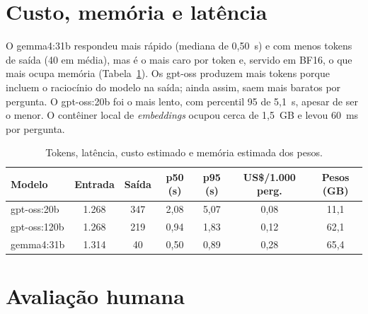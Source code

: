 \section{Custo, memória e latência}

O gemma4:31b respondeu mais rápido (mediana de 0,50~s) e com menos tokens de saída (40 em
média), mas é o mais caro por token e, servido em BF16, o que mais ocupa memória
(Tabela~\ref{tab:custo}). Os gpt-oss produzem mais tokens porque incluem o raciocínio do
modelo na saída; ainda assim, saem mais baratos por pergunta. O gpt-oss:20b foi o mais
lento, com percentil 95 de 5,1~s, apesar de ser o menor. O contêiner local de
\textit{embeddings} ocupou cerca de 1,5~GB e levou 60~ms por pergunta.

\begin{table}[htb]
\centering
\caption{Tokens, latência, custo estimado e memória estimada dos pesos.}
\label{tab:custo}
\small\setlength{\tabcolsep}{4pt}
\begin{tabular}{lcccccc}
\toprule
\textbf{Modelo} & \textbf{Entrada} & \textbf{Saída} & \textbf{p50 (s)} & \textbf{p95 (s)} & \textbf{US\$/1.000 perg.} & \textbf{Pesos (GB)} \\
\midrule
gpt-oss:20b  & 1.268 & 347 & 2,08 & 5,07 & 0,08 & 11,1 \\
gpt-oss:120b & 1.268 & 219 & 0,94 & 1,83 & 0,12 & 62,1 \\
gemma4:31b   & 1.314 &  40 & 0,50 & 0,89 & 0,28 & 65,4 \\
\bottomrule
\end{tabular}
\end{table}

\section{Avaliação humana}

